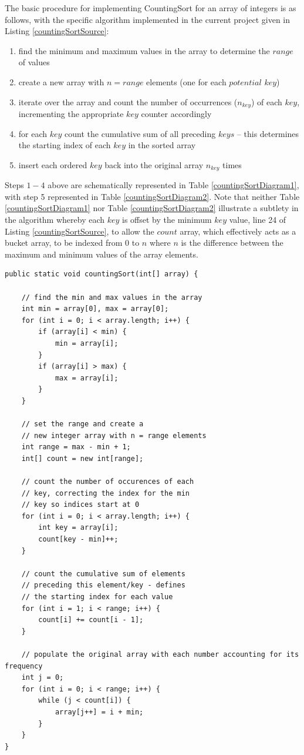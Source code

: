 \documentclass[12pt,a4paper]{article}
\begin{document}
The basic procedure for implementing CountingSort for an array of integers is as follows, with the specific algorithm \cite{counting_sort1, counting_sort2} implemented in the current project given in Listing \ref{countingSortSource}:

\begin{enumerate}
\item find the minimum and maximum values in the array to determine the $range$ of values
\item create a new array with $n = range$ elements (one for each $potential$ $key$)
\item iterate over the array and count the number of occurrences ($n_{key}$) of each $key$, incrementing the appropriate $key$ counter accordingly
\item for each $key$ count the cumulative sum of all preceding $keys$ -- this determines the starting index of each $key$ in the sorted array
\item insert each ordered $key$ back into the original array $n_{key}$ times
\end{enumerate}

Steps $1-4$ above are schematically represented in Table \ref{countingSortDiagram1}, with step 5 represented in Table \ref{countingSortDiagram2}. Note that neither Table \ref{countingSortDiagram1} nor Table \ref{countingSortDiagram2} illustrate a subtlety in the algorithm whereby each $key$ is offset by the minimum $key$ value, line 24 of Listing \ref{countingSortSource}, to allow the $count$ array, which effectively acts as a bucket array, to be indexed from $0$ to $n$ where $n$ is the difference between the maximum and minimum values of the array elements.

\begin{lstlisting}[caption={CountingSort algorithm implemented in the current project \cite{counting_sort1, counting_sort2}.},captionpos=b, label={countingSortSource}]
public static void countingSort(int[] array) {

	// find the min and max values in the array
	int min = array[0], max = array[0];
	for (int i = 0; i < array.length; i++) {
		if (array[i] < min) {
			min = array[i];
		}
		if (array[i] > max) {
			max = array[i];
		}
	}

	// set the range and create a
	// new integer array with n = range elements
	int range = max - min + 1;
	int[] count = new int[range];

	// count the number of occurences of each
	// key, correcting the index for the min
	// key so indices start at 0
	for (int i = 0; i < array.length; i++) {
		int key = array[i];
		count[key - min]++;
	}

	// count the cumulative sum of elements
	// preceding this element/key - defines
	// the starting index for each value
	for (int i = 1; i < range; i++) {
		count[i] += count[i - 1];
	}

	// populate the original array with each number accounting for its frequency
	int j = 0;
	for (int i = 0; i < range; i++) {
		while (j < count[i]) {
			array[j++] = i + min;
		}
	}
}

\end{lstlisting}
\end{document}
